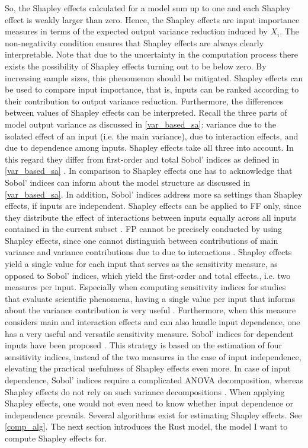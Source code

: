 So, the Shapley effects calculated for a model sum up to one and each Shapley effect is weakly larger than zero. Hence, the Shapley effects are input importance measures in terms of the expected output variance reduction induced by $X_i$. The non-negativity condition ensures that Shapley effects are always clearly interpretable. Note that due to the uncertainty in the computation process there exists the possibility of Shapley effects turning out to be below zero. By increasing sample sizes, this phenomenon should be mitigated.
Shapley effects can be used to compare input importance, that is, inputs can be ranked according to their contribution to output variance reduction. Furthermore, the differences between values of Shapley effects can be interpreted.
Recall the three parts of model output variance as discussed in \cref{var_based_sa}: variance due to the isolated effect of an input (i.e. the main variance), due to interaction effects, and due to dependence among inputs. Shapley effects take all three into account. In this regard they differ from first-order and total Sobol’ indices as defined in \cref{var_based_sa} \cite{O14}.
In comparison to Shapley effects one has to acknowledge that Sobol’ indices can inform about the model structure as discussed in \cref{var_based_sa}. In addition, Sobol’ indices address more sa settings than Shapley effects, if inputs are independent. Shapley effects can be applied to FF only, since they distribute the effect of interactions between inputs equally across all inputs contained in the current subset \cite{IP19}. FP cannot be precisely conducted by using Shapley effects, since one cannot distinguish between contributions of main variance and variance contributions due to due to interactions \cite{IP19}.
Shapley effects yield a single value for each input that serves as the sensitivity measure, as opposed to Sobol’ indices, which yield the first-order and total effects., i.e. two measures per input. Especially when computing sensitivity indices for studies that evaluate scientific phenomena, having a single value per input that informs about the variance contribution is very useful \cite{SNS16}. Furthermore, when this measure considers main and interaction effects and can also handle input dependence, one has a very useful and versatile sensitivity measure.
Sobol’ indices for dependent inputs have been proposed \cite{MTA15}. This strategy is based on the estimation of four sensitivity indices, instead of the two measures in the case of input independence, elevating the practical usefulness of Shapley effects even more. In case of input dependence, Sobol’ indices require a complicated ANOVA decomposition, whereas Shapley effects do not rely on such variance decompositions \cite{IP19}. When applying Shapley effects, one would not even need to know whether input dependence or independence prevails.
Several algorithms exist for estimating Shapley effects. See \cref{comp_alg}. The next section introduces the Rust model, the model I want to compute Shapley effects for.
